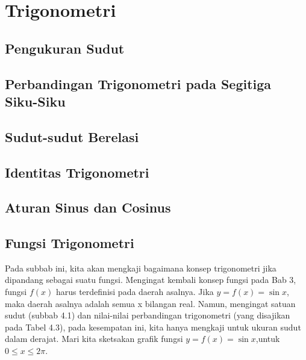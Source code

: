\documentclass[11pt,fleqn]{book} %
\begin{document}



\chapter{Trigonometri}

\section{Pengukuran Sudut}

\section{Perbandingan Trigonometri pada Segitiga Siku-Siku}

\section{Sudut-sudut Berelasi}


\section{Identitas Trigonometri}

\section{Aturan Sinus dan Cosinus}

\section{Fungsi Trigonometri}

Pada subbab ini, kita akan  mengkaji bagaimana konsep trigonometri jika dipandang sebagai suatu fungsi. Mengingat kembali konsep fungsi pada Bab 3, fungsi $f(x)$ harus terdefinisi pada daerah asalnya. Jika $y = f(x) = \sin x$, maka daerah asalnya adalah semua x bilangan real. Namun, mengingat satuan sudut  (subbab 4.1) dan nilai-nilai perbandingan trigonometri (yang disajikan pada Tabel 4.3),  pada kesempatan ini, kita hanya mengkaji  untuk  ukuran sudut dalam derajat. Mari kita sketsakan grafik fungsi $y = f(x) = \sin x$,untuk $0 \leq x\leq 2\pi$.\\
\end{document}
